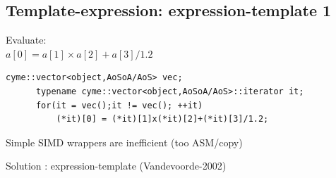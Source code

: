 \documentclass{beamer}
\begin{document}
\subsection*{Template-expression: expression-template 1}
\begin{frame}[fragile]
Evaluate: \\
\centering
$\boxed{a[0] = a[1]  \times a[2]  +a[3]/1.2}$

\vspace{0.5cm}

\begin{lstlisting}[flexiblecolumns=true,basicstyle=\sffamily]     
      cyme::vector<object,AoSoA/AoS> vec;
      typename cyme::vector<object,AoSoA/AoS>::iterator it;
      for(it = vec();it != vec(); ++it)
          (*it)[0] = (*it)[1]x(*it)[2]+(*it)[3]/1.2;
\end{lstlisting}
\vspace{0.5cm}

Simple SIMD wrappers are inefficient (too ASM/copy)

Solution : expression-template (Vandevoorde-2002)




\end{frame}



\end{document}
